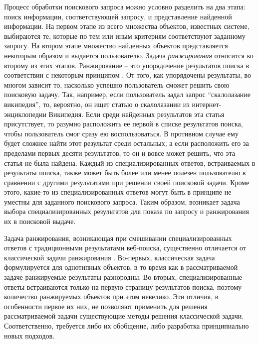 \documentclass[12pt,a4paper]{report}
\begin{document}
Процесс обработки поискового запроса можно условно разделить на два этапа: поиск информации, соответствующей запросу, и представление найденной информации.
На первом этапе из всего множества объектов, известных системе, выбираются те, которые по тем или иным критериям соответствуют заданному запросу. На втором этапе множество найденных объектов представляется некоторым образом и выдается пользователю. 
Задача \emph{ранжирования} относится ко второму из этих этапов. Ранжирование -- это упорядочение результатов поиска в соответствии с некоторым принципом \cite{Ashmanov, LiuLR}. От того, как упорядочены результаты, во многом зависит то, насколько успешно пользователь сможет решить свою поисковую задачу. 
Так, например, если пользователь задал запрос ``скалолазание википедия'', то, вероятно, он ищет статью о скалолазании из интернет-энциклопедии Википедия. Если среди найденных результатов эта статья присутствует, то разумно расположить ее первой в списке результатов поиска, чтобы пользователь смог сразу ею воспользоваться. В противном случае ему будет сложнее найти этот результат среди остальных, а если расположить его за пределами первых десяти результатов, то он и вовсе может решить, что эта статья не была найдена. Каждый из специализированных ответов, встраиваемых в результаты поиска, также может быть более или менее полезен пользователю в сравнении с другими результатами при решении своей поисковой задачи. 
Кроме этого, какие-то из специализированных ответов могут быть в принципе не уместны для заданного поискового запроса. Таким образом, возникает задача выбора специализированных результатов для показа по запросу и ранжирования их в поисковой выдаче. 

Задача ранжирования, возникающая при смешивании специализированных ответов с традиционными результатами веб-поиска, существенно отличается от классической задачи ранжирования \cite{LiuLR}. 
Во-первых, классическая задача формулируется для однотипных объектов, в то время как в рассматриваемой задаче ранжируемые результаты разнородны.
Во-вторых, специализированные ответы встраиваются только на первую страницу результатов поиска, поэтому количество ранжируемых объектов при этом невелико. Эти отличия, в особенности первое их них, не позволяют применить для решения рассматриваемой задачи существующие методы решения классической задачи. Соответственно, требуется либо их обобщение, либо разработка принципиально новых подходов.
\end{document}
